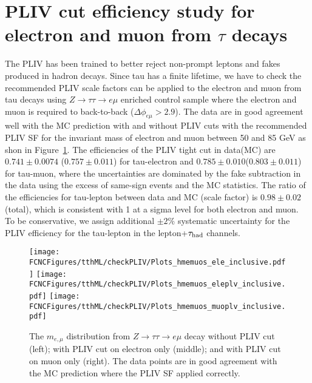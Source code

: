 \section{PLIV cut efficiency study for electron and muon from $\tau$ decays}
\label{sec:CheckPLIV}

The PLIV has been trained to better reject non-prompt leptons and fakes produced in hadron decays. Since tau has a finite lifetime, we have to check the
recommended PLIV scale factors can be applied to the electron and muon from tau decays using $Z\rightarrow \tau\tau\rightarrow e\mu$ enriched control sample
where the electron and muon is required to back-to-back ($\Delta\phi_{e\mu}>2.9$). The data are in good agreement well with the MC prediction with and without
PLIV cuts with the recommended PLIV SF for the invariant mass of electron and muon between 50 and 85 GeV as shon in Figure~\ref{fig:ap9_checkpliv}. The efficiencies of
the PLIV tight cut in data(MC) are $0.741\pm 0.0074$ ($0.757\pm 0.011$) for tau-electron and $0.785\pm 0.010$($0.803\pm 0.011$) for tau-muon, where the uncertainties are
dominated by the fake subtraction in the data using the excess of same-sign events and the MC statistics. The ratio of the efficiencies for tau-lepton between data
and MC (scale factor) is $0.98\pm 0.02$(total), which is consistent with 1 at a sigma level for both electron and muon. To be conservative, we assign additional $\pm 2\%$ systematic uncertainty for the PLIV efficiency for the tau-lepton in the lepton+$\tau_\text{had}$ channels. 

\begin{figure}[H]
\centering
\texttt{[image: \\FCNCFigures/tthML/checkPLIV/Plots\_hmemuos\_ele\_inclusive.pdf]}
\texttt{[image: \\FCNCFigures/tthML/checkPLIV/Plots\_hmemuos\_eleplv\_inclusive.pdf]}
\texttt{[image: \\FCNCFigures/tthML/checkPLIV/Plots\_hmemuos\_muoplv\_inclusive.pdf]}
\caption{ The $m_{e,\mu}$ distribution from $Z\rightarrow\tau\tau\rightarrow e\mu$ decay without PLIV cut (left); with PLIV cut on electron only (middle); and
  with PLIV cut on muon only (right). The data points are in good agreement with the MC prediction where the PLIV SF applied correctly.}
\label{fig:ap9_checkpliv}
\end{figure}

